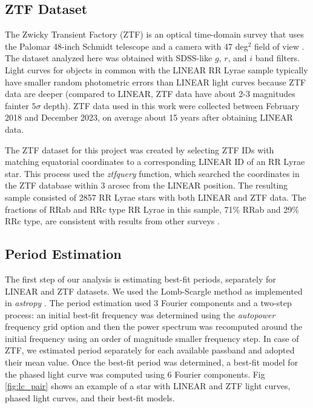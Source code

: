 \subsection{ZTF Dataset}

The Zwicky Transient Factory (ZTF) is an optical time-domain survey that uses the Palomar 48-inch Schmidt telescope
and a camera with 47 deg$^2$ field of view \citep{2019PASP..131a8002B}. The dataset analyzed here was obtained with
SDSS-like $g$, $r$, and $i$ band filters. Light curves for objects in common with the LINEAR RR Lyrae sample typically
have smaller random photometric errors than LINEAR light curves because ZTF data are deeper (compared to LINEAR,
ZTF data have about 2-3 magnitudes fainter  $5\sigma$ depth). ZTF data used in this work were collected between
February 2018 and December 2023, on average about 15 years after obtaining LINEAR data. 

The ZTF dataset for this project was created by selecting ZTF IDs with matching equatorial coordinates to a corresponding
LINEAR ID of an RR Lyrae star. This process used the {\it ztfquery} function, which searched the coordinates in the ZTF database
within 3 arcsec from the LINEAR position. The resulting sample consisted of 2857 RR Lyrae stars with both LINEAR and ZTF data.
The fractions of RRab and RRc type RR Lyrae in this sample, 71\% RRab and 29\% RRc type, are consistent with results from
other surveys \citep[e.g.,][]{2010ApJ...708..717S}. 


\subsection{Period Estimation}

The first step of our analysis is estimating best-fit periods, separately for LINEAR and ZTF datasets. 
We used the Lomb-Scargle method \citep{2015zndo.....14833V} as implemented in {\it astropy}
\citep{2018AJ....156..123A}. The period estimation used 3 Fourier components and a two-step process: an initial
best-fit frequency was determined using the {\it autopower} frequency grid option and then the power spectrum was
recomputed around the initial frequency using an order of magnitude smaller frequency step. In case of ZTF, we
estimated period separately for each available passband and adopted their mean value. Once the best-fit
period was determined, a best-fit model for the phased light curve was computed using 6 Fourier components.
Fig \ref{fig:lc_pair} shows an example of a star with LINEAR and ZTF light curves, phased light curves, and their
best-fit models.  


